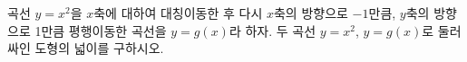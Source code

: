 곡선 $y=x^2$을 $x$축에 대하여 대칭이동한 후 다시 $x$축의 방향으로 $-1$만큼, $y$축의 방향으로 1만큼 평행이동한 곡선을 $y=g(x)$라 하자. 두 곡선 $y=x^2$, $y=g(x)$로 둘러싸인 도형의 넓이를 구하시오.
